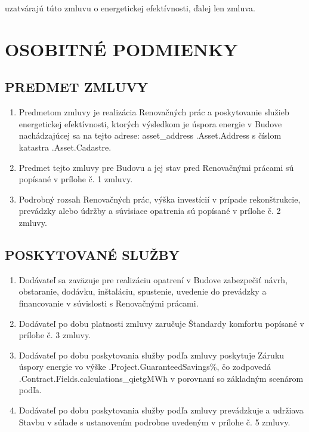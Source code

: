 uzatvárajú túto zmluvu o energetickej efektívnosti, ďalej len zmluva.

\section{OSOBITNÉ PODMIENKY}
\subsection{PREDMET ZMLUVY}
\begin{enumerate}
	\item	Predmetom zmluvy je realizácia Renovačných prác a poskytovanie služieb energetickej efektívnosti, ktorých výsledkom je úspora energie v Budove nachádzajúcej sa na tejto adrese:  {{asset_address .Asset.Address}} s číslom katastra  {{.Asset.Cadastre}}.
	\item	Predmet tejto zmluvy pre Budovu a jej stav pred Renovačnými prácami sú popísané v prílohe č. 1 zmluvy.
	\item	Podrobný rozsah Renovačných  prác, výška investícií v prípade rekonštrukcie, prevádzky alebo údržby a súvisiace opatrenia sú popísané v  prílohe č. 2 zmluvy. 
\end{enumerate}

\subsection{POSKYTOVANÉ SLUŽBY}
\begin{enumerate}
	\item   Dodávateľ sa zaväzuje pre realizáciu opatrení v Budove zabezpečiť návrh, obstaranie, dodávku, inštaláciu, spustenie, uvedenie do prevádzky a financovanie v súvislosti s Renovačnými prácami.
	\item	Dodávateľ po dobu platnosti zmluvy zaručuje Štandardy komfortu popísané v prílohe č. 3 zmluvy.
  \item	Dodávateľ po dobu poskytovania služby podľa zmluvy poskytuje Záruku úspory energie vo výške  {{.Project.GuaranteedSavings}}\%, čo zodpovedá  {{.Contract.Fields.calculations_qietg}}MWh v porovnaní so základným scenárom podľa.
	\item	Dodávateľ po dobu poskytovania služby podľa zmluvy prevádzkuje a udržiava Stavbu v súlade s ustanovením podrobne uvedeným v prílohe č. 5 zmluvy.
\end{enumerate}

